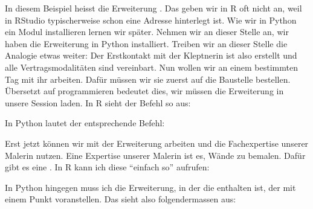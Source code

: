 \documentclass[letterpaper,10pt,english]{sphinxmanual}
\begin{document}
In diesem Beispiel heisst die Erweiterung . Das  geben wir in R oft nicht an, weil in RStudio typischerweise schon eine Adresse hinterlegt ist. Wie wir in Python ein Modul installieren lernen wir später. Nehmen wir an dieser Stelle an, wir haben die Erweiterung  in Python installiert. Treiben wir an dieser Stelle die Analogie etwas weiter: Der Erstkontakt mit der Kleptnerin ist also erstellt und alle Vertragsmodalitäten sind vereinbart. Nun wollen wir an einem bestimmten Tag mit ihr arbeiten. Dafür müssen wir sie zuerst auf die Baustelle bestellen. Übersetzt auf programmieren bedeutet dies, wir müssen die Erweiterung in unsere Session laden. In R sieht der Befehl so aus:

\begin{sphinxVerbatim}[commandchars=\\\{\}]
\end{sphinxVerbatim}

In Python lautet der entsprechende Befehl:

\begin{sphinxVerbatim}[commandchars=\\\{\}]
 
\end{sphinxVerbatim}

Erst jetzt können wir mit der Erweiterung arbeiten und die Fachexpertise unserer Malerin nutzen. Eine Expertise unserer Malerin ist es, Wände zu bemalen. Dafür gibt es eine  . In R kann ich diese  “einfach so” aufrufen:

\begin{sphinxVerbatim}[commandchars=\\\{\}]
\end{sphinxVerbatim}

In Python hingegen muss ich die Erweiterung, in der die  enthalten ist, der  mit einem Punkt voranstellen. Das sieht also folgendermassen aus:

\begin{sphinxVerbatim}[commandchars=\\\{\}]
\end{sphinxVerbatim}
\end{document}
